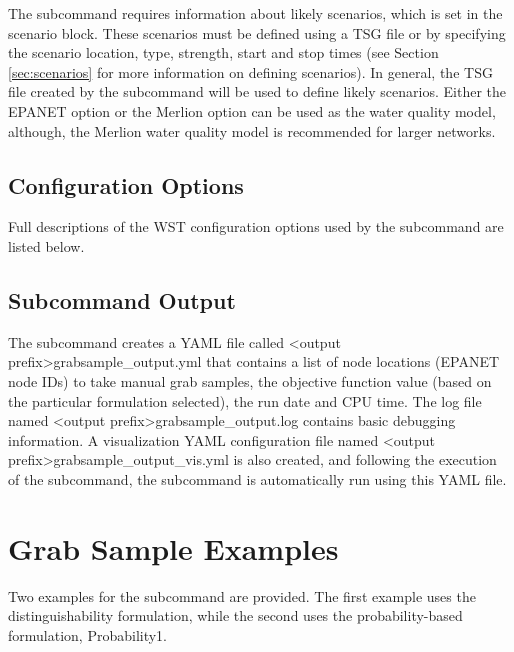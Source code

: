 The  subcommand requires information about likely scenarios, which is set in the scenario block.
These scenarios must be defined using a TSG file or by specifying the scenario location, type, 
strength, start and stop times (see Section \ref{sec:scenarios} for more information on defining scenarios).
In general, the TSG file created by the  subcommand will be used to define likely scenarios.
Either the EPANET option or the Merlion option can be used as the water quality model, although, the Merlion
water quality model is recommended for larger networks. 


\subsection{Configuration Options}

Full descriptions of the WST configuration options used by
the  subcommand are listed below.


\subsection{Subcommand Output}
The  subcommand creates a YAML file called <output prefix>grabsample\_output.yml that contains
a list of node locations (EPANET node IDs) to 
take manual grab samples, the objective function value (based on the particular formulation selected), 
the run date and CPU time. 
The log file named <output prefix>grabsample\_output.log contains basic debugging information. 
A visualization YAML configuration file named <output prefix>grabsample\_output\_vis.yml is also created, and
following the execution of the  subcommand, 
the  subcommand is automatically run using this YAML file.

\section{Grab Sample Examples}
Two examples for the  subcommand are provided. The first example uses the distinguishability
formulation, while the second uses the probability-based formulation, Probability1.

